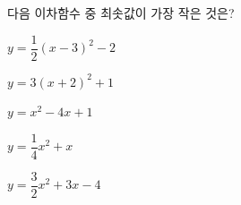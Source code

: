 다음 이차함수 중 최솟값이 가장 작은 것은?
\begin{choicesii}{\rule[-3ex]{0pt}{8ex}$y=\dfrac{1}{2}(x-3)^2-2$}{\rule[-3ex]{0pt}{8ex}$y=3(x+2)^2+1$}{\rule[-3ex]{0pt}{8ex}$y=x^2-4x+1$}{\rule[-3ex]{0pt}{8ex}$y=\dfrac{1}{4}x^2+x$}{\rule[-3ex]{0pt}{8ex}$y=\dfrac{3}{2}x^2+3x-4$}\end{choicesii}
